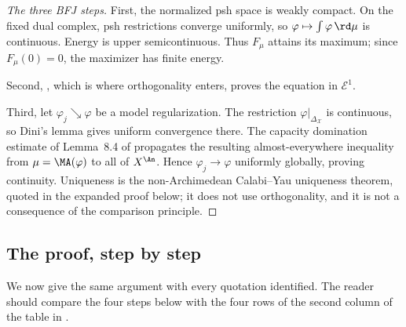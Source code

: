 \begin{proof}[The three BFJ steps]
First, the normalized psh space is weakly compact.  On the fixed dual
complex, psh restrictions converge uniformly, so
\(\varphi\mapsto\int\varphi\,\rd \mu\) is continuous.  Energy is upper
semicontinuous.  Thus \(F_\mu\) attains its maximum; since
\(F_\mu(0)=0\), the maximizer has finite energy.

Second, , which is where
orthogonality enters, proves the equation in \(\mathcal E^1\).

Third, let \(\varphi_j\searrow\varphi\) be a model regularization.  The
restriction \(\varphi|_{\Delta_{\mathcal X}}\) is continuous, so Dini's
lemma gives uniform convergence there.  The capacity domination estimate
of Lemma~8.4 of \cite{BFJ15} propagates the resulting almost-everywhere
inequality from \(\mu=\MA(\varphi)\) to all of \(X^{\An}\).  Hence
\(\varphi_j\to\varphi\) uniformly globally, proving continuity.  Uniqueness
is the non-Archimedean Calabi--Yau uniqueness theorem, quoted in the
expanded proof below; it does not use orthogonality, and it is not a
consequence of the comparison principle.
\end{proof}

\subsection{The proof, step by step}
\label{sec:ch28-bfj-proof}

We now give the same argument with every quotation identified.  The reader
should compare the four steps below with the four rows of the second column
of the table in .

